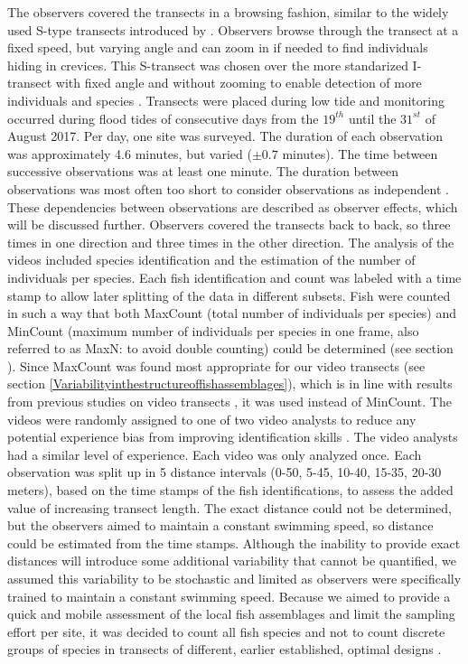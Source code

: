\documentclass[10pt,letterpaper]{article}
\begin{document}
The observers covered the transects in a browsing fashion, similar to the widely used S-type transects introduced by \cite{Pelletier2011}. Observers browse through the transect at a fixed speed, but varying angle and can zoom in if needed to find individuals hiding in crevices. This S-transect was chosen over the more standarized I-transect with fixed angle and without zooming to enable detection of more individuals and species \cite{Mallet2014,Pelletier2011}. Transects were placed during low tide and monitoring occurred during flood tides of consecutive days from the $19^{th}$ until the $31^{st}$ of August 2017. Per day, one site was surveyed. The duration of each observation was approximately 4.6 minutes, but varied ($\pm 0.7$ minutes). The time between successive observations was at least one minute. The duration between observations was most often too short to consider observations as independent \cite{Emslie2018ReefRecover}. These dependencies between observations are described as observer effects, which will be discussed further. Observers covered the transects back to back, so three times in one direction and three times in the other direction. The analysis of the videos included species identification and the estimation of the number of individuals per species. Each fish identification and count was labeled with a time stamp to allow later splitting of the data in different subsets. Fish were counted in such a way that both MaxCount (total number of individuals per species) and MinCount (maximum number of individuals per species in one frame, also referred to as MaxN: to avoid double counting) 
could be determined (see section ). Since MaxCount was found most appropriate for our video transects (see section \ref{Variabilityinthestructureoffishassemblages}), which is in line with results from previous studies on video transects \cite{Mallet2014,Wartenberg2015}, it was used instead of MinCount. The videos were randomly assigned to one of two video analysts to reduce any potential experience bias from improving identification skills \cite{Williams2006}. The video analysts had a similar level of experience. Each video was only analyzed once. Each observation was split up in 5 distance intervals (0-50, 5-45, 10-40, 15-35, 20-30 meters), based on the time stamps of the fish identifications, to assess the added value of increasing transect length. The exact distance could not be determined, but the observers aimed to maintain a constant swimming speed, so distance could be estimated from the time stamps. Although the inability to provide exact distances will introduce some additional variability that cannot be quantified, we assumed this variability to be stochastic and limited as observers were specifically trained to maintain a constant swimming speed. Because we aimed to provide a quick and mobile assessment of the local fish assemblages and limit the sampling effort per site, it was decided to count all fish species \cite{Bernard2013,Watson2010} and not to count discrete groups of species in transects of different, earlier established, optimal designs \cite{McClanahan2007,Wilson2018}. 
\end{document}
